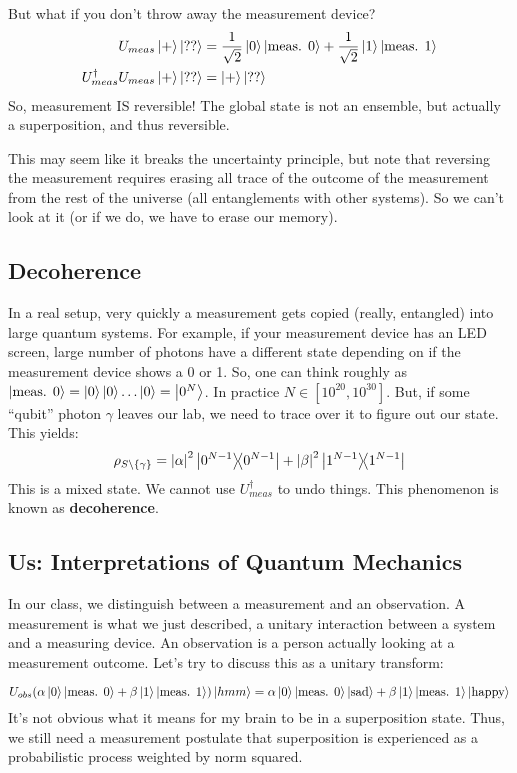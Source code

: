 But what if you don't throw away the measurement device?
\begin{align*}
    U_{meas} \ket{+} \ket{??} &= \frac{1}{\sqrt{2}} \ket{0} \ket{\text{meas. } 0} + \frac{1}{\sqrt{2}} \ket{1} \ket{\text{meas. } 1} \\
    U_{meas}^{\dagger} U_{meas} \ket{+} \ket{??} &= \ket{+} \ket{??}
\end{align*}
So, measurement IS reversible! The global state is not an ensemble, but actually a superposition, and thus reversible.

This may seem like it breaks the uncertainty principle,
but note that reversing the measurement requires erasing all trace of the outcome of the measurement from the rest of the universe
(all entanglements with other systems). So we can't look at it (or if we do, we have to erase our memory).

\subsection{Decoherence}
In a real setup, very quickly a measurement gets copied (really, entangled) into large quantum systems. For example, if your measurement device has an LED screen,
large number of photons have a different state depending on if the measurement device shows a 0 or 1.
So, one can think roughly as $\ket{\text{meas. } 0} = \ket{0}\ket{0}\dots \ket{0} = \ket{0^N}$. In practice $N \in [10^{20}, 10^{30}]$. But, if some ``qubit'' photon $\gamma$ leaves our lab,
we need to trace over it to figure out our state. This yields:
\[ \rho_{S\setminus \{ \gamma\}} = \qty|\alpha|^2 \ketbra{0^{N - 1}} + \qty|\beta|^2 \ketbra{1^{N - 1}} \]
This is a mixed state. We cannot use $U_{meas}^{\dagger}$ to undo things.
This phenomenon is known as \textbf{decoherence}.

\subsection{Us: Interpretations of Quantum Mechanics}
In our class, we distinguish between a measurement and an observation. A measurement is what we just described, a unitary interaction between a system and a measuring device.
An observation is a person actually looking at a measurement outcome. Let's try to discuss this as a unitary transform:

\[ U_{obs} \qty(\alpha \ket{0} \ket{\text{meas. } 0} + \beta\ket{1} \ket{\text{meas. } 1}) \ket{hmm} =  \alpha \ket{0} \ket{\text{meas. } 0} \ket{\text{sad}} + \beta\ket{1} \ket{\text{meas. } 1} \ket{\text{happy}}  \]
It's not obvious what it means for my brain to be in a superposition state. Thus, we still need a measurement postulate that superposition is experienced as a probabilistic process weighted by norm squared.

